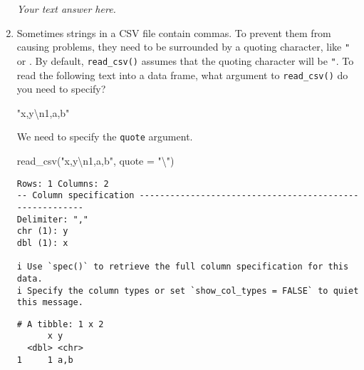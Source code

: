 \documentclass[
  letterpaper,
  DIV=11,
  numbers=noendperiod]{scrreprt}
\newenvironment{Shaded}{\begin{snugshade}}{\end{snugshade}}
\newcommand{\AttributeTok}[1]{\textcolor[rgb]{0.40,0.45,0.13}{#1}}
\newcommand{\FunctionTok}[1]{\textcolor[rgb]{0.28,0.35,0.67}{#1}}
\newcommand{\NormalTok}[1]{\textcolor[rgb]{0.00,0.23,0.31}{#1}}
\newcommand{\SpecialCharTok}[1]{\textcolor[rgb]{0.37,0.37,0.37}{#1}}
\newcommand{\StringTok}[1]{\textcolor[rgb]{0.13,0.47,0.30}{#1}}
\begin{document}
\begin{enumerate}
\begin{tcolorbox}
  \emph{Your text answer here.}

  \end{tcolorbox}
\item
  Sometimes strings in a CSV file contain commas. To prevent them from
  causing problems, they need to be surrounded by a quoting character,
  like \texttt{"} or \texttt{\textquotesingle{}}. By default,
  \texttt{read\_csv()} assumes that the quoting character will be
  \texttt{"}. To read the following text into a data frame, what
  argument to \texttt{read\_csv()} do you need to specify?

\begin{Shaded}
\begin{Highlighting}[]
\StringTok{"x,y}\SpecialCharTok{\textbackslash{}n}\StringTok{1,\textquotesingle{}a,b\textquotesingle{}"}
\end{Highlighting}
\end{Shaded}

  \begin{tcolorbox}[enhanced jigsaw, breakable, bottomtitle=1mm, left=2mm, colback=white, toprule=.15mm, leftrule=.75mm, colframe=quarto-callout-note-color-frame, colbacktitle=quarto-callout-note-color!10!white, title={Answer}, coltitle=black, toptitle=1mm, bottomrule=.15mm, opacitybacktitle=0.6, arc=.35mm, rightrule=.15mm, titlerule=0mm, opacityback=0]

  We need to specify the \texttt{quote} argument.

\begin{Shaded}
\begin{Highlighting}[]
\FunctionTok{read\_csv}\NormalTok{(}\StringTok{"x,y}\SpecialCharTok{\textbackslash{}n}\StringTok{1,\textquotesingle{}a,b\textquotesingle{}"}\NormalTok{, }\AttributeTok{quote =} \StringTok{"}\SpecialCharTok{\textbackslash{}\textquotesingle{}}\StringTok{"}\NormalTok{)}
\end{Highlighting}
\end{Shaded}

\begin{verbatim}
Rows: 1 Columns: 2
-- Column specification --------------------------------------------------------
Delimiter: ","
chr (1): y
dbl (1): x

i Use `spec()` to retrieve the full column specification for this data.
i Specify the column types or set `show_col_types = FALSE` to quiet this message.
\end{verbatim}

\begin{verbatim}
# A tibble: 1 x 2
      x y    
  <dbl> <chr>
1     1 a,b  
\end{verbatim}


\end{tcolorbox}
\end{enumerate}
\end{document}
